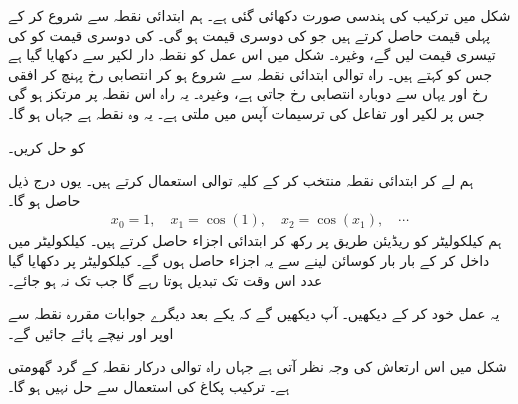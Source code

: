 شکل  میں ترکیب کی  ہندسی صورت  دکھائی گئی ہے۔ ہم ابتدائی نقطہ  سے شروع کر کے پہلی قیمت  حاصل کرتے ہیں جو  کی دوسری قیمت  ہو گی۔  کی دوسری قیمت  کو  کی تیسری قیمت  لیں گے، وغیرہ۔  شکل  میں اس عمل کو نقطہ دار لکیر سے دکھایا گیا ہے جس کو  کہتے ہیں۔ راہ توالی ابتدائی نقطہ  سے شروع ہو کر انتصابی رخ  پہنچ کر افقی رخ  اور یہاں سے دوبارہ  انتصابی رخ  جاتی ہے، وغیرہ۔ یہ راہ اس نقطہ پر مرتکز ہو گی جس پر لکیر  اور  تفاعل   کی ترسیمات  آپس میں  ملتی ہے۔ یہ وہ نقطہ ہے جہاں  ہو گا۔  

 کو حل کریں۔

ہم  لے کر ابتدائی نقطہ   منتخب کر کے کلیہ توالی  استعمال کرتے ہیں۔ یوں درج ذیل حاصل ہو گا۔
\begin{align*}
x_0=1,\quad x_1=\cos (1),\quad x_2=\cos(x_1),\quad \cdots
\end{align*}
ہم کیلکولیٹر کو ریڈیئن  طریق پر رکھ کر   ابتدائی  اجزاء حاصل کرتے ہیں۔ کیلکولیٹر میں  داخل کر کے بار بار کوسائن لینے سے یہ اجزاء حاصل ہوں گے۔ کیلکولیٹر پر دکھایا گیا عدد اس وقت تک تبدیل ہوتا رہے گا  جب تک  نہ ہو جائے۔

یہ عمل خود کر کے دیکھیں۔ آپ دیکھیں گے کہ یکے بعد دیگرے جوابات  مقررہ  نقطہ  سے اوپر اور نیچے پائے جائیں گے۔

شکل  میں اس ارتعاش کی وجہ نظر آتی ہے جہاں راہ توالی درکار نقطہ کے گرد گھومتی ہے۔
ترکیب پکاغ  کی استعمال سے  حل نہیں ہو گا۔


